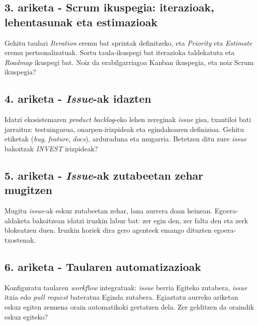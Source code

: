 
\subsection{3. ariketa - Scrum ikuspegia: iterazioak, lehentasunak eta estimazioak}

Gehitu taulari \textit{Iteration} eremu bat sprintak definitzeko, eta \textit{Priority} eta \textit{Estimate} eremu pertsonalizatuak.
Sortu taula-ikuspegi bat iterazioka taldekatuta eta \textit{Roadmap} ikuspegi bat.
Noiz da erabilgarriagoa Kanban ikuspegia, eta noiz Scrum ikuspegia?


\subsection{4. ariketa - \textit{Issue}-ak idazten}

Idatzi ekosistemaren \textit{product backlog}-eko lehen zereginak \textit{issue} gisa, txantiloi bati jarraituz: testuingurua, onarpen-irizpideak eta egindakoaren definizioa.
Gehitu etiketak (\textit{bug}, \textit{feature}, \textit{docs}), arduraduna eta mugarria.
Betetzen ditu zure \textit{issue} bakoitzak \textit{INVEST} irizpideak?


\subsection{5. ariketa - \textit{Issue}-ak zutabeetan zehar mugitzen}

Mugitu \textit{issue}-ak eskuz zutabeetan zehar, lana aurrera doan heinean.
Egoera-aldaketa bakoitzean idatzi iruzkin labur bat: zer egin den, zer falta den eta zerk blokeatzen duen.
Iruzkin horiek dira gero agenteek emango dituzten egoera-txostenak.


\subsection{6. ariketa - Taularen automatizazioak}

Konfiguratu taularen \textit{workflow} integratuak: \textit{issue} berria Egiteko zutabera, \textit{issue} itxia edo \textit{pull request} bateratua Eginda zutabera.
Egiaztatu aurreko ariketan eskuz egiten zenuena orain automatikoki gertatzen dela.
Zer gelditzen da oraindik eskuz egiteko?

